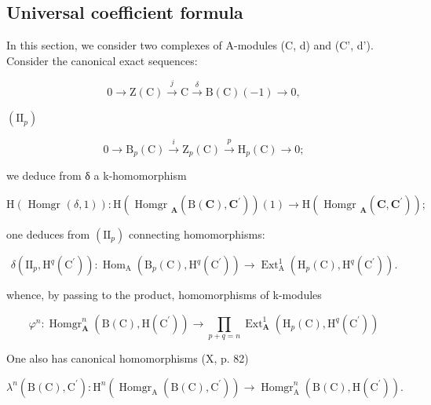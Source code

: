 \subsection{Universal coefficient formula}

In this section, we consider two complexes of A-modules (C, d) and (C', d'). Consider the canonical exact sequences:

\[
0 \rightarrow \mathrm{Z} (\mathrm{C}) \stackrel {{j}} {{\rightarrow}} \mathrm{C} \stackrel {{\delta}} {{\rightarrow}} \mathrm{B} (\mathrm{C}) (- 1) \rightarrow 0,\tag{I}
\]

\((\mathrm{II}_{p})\)

\[
0 \to \mathrm{B} _ {p} (\mathrm{C}) \stackrel {{i}} {{\to}} \mathrm{Z} _ {p} (\mathrm{C}) \stackrel {{p}} {{\to}} \mathrm{H} _ {p} (\mathrm{C}) \to 0;
\]

we deduce from δ a k-homomorphism

\[
\mathrm{H} (\text { Homgr } (\delta , 1)): \mathrm{H} (\text { Homgr } _ {\mathbf {A}} (\mathrm{B} (\mathbf {C}), \mathbf {C} ^ {\prime})) (1) \rightarrow \mathrm{H} (\text { Homgr } _ {\mathbf {A}} (\mathbf {C}, \mathbf {C} ^ {\prime}));
\]

one deduces from \((\mathrm{II}_{p})\) connecting homomorphisms:

\[
\delta \left(\mathrm{II} _ {p}, \mathrm{H} ^ {q} \left(\mathrm{C} ^ {\prime}\right)\right): \operatorname{Hom} _ {\mathrm{A}} \left(\mathrm{B} _ {p} (\mathrm{C}), \mathrm{H} ^ {q} \left(\mathrm{C} ^ {\prime}\right)\right)\rightarrow \operatorname{Ext} _ {\mathrm{A}} ^ {1} \left(\mathrm{H} _ {p} (\mathrm{C}), \mathrm{H} ^ {q} \left(\mathrm{C} ^ {\prime}\right)\right).
\]

whence, by passing to the product, homomorphisms of k-modules

\[
\varphi^ {n}: \operatorname{Homgr} _ {\mathbf {A}} ^ {n} (\mathrm{B} (\mathrm{C}), \mathrm{H} (\mathrm{C} ^ {\prime})) \rightarrow \prod_ {p + q = n} \operatorname{Ext} _ {\mathbf {A}} ^ {1} \left(\mathrm{H} _ {p} (\mathrm{C}), \mathrm{H} ^ {q} (\mathrm{C} ^ {\prime})\right)
\]

One also has canonical homomorphisms (X, p. 82)

\[
\lambda^ {n} (\mathrm{B} (\mathrm{C}), \mathrm{C} ^ {\prime}): \mathrm{H} ^ {n} \left(\operatorname{Homgr} _ {\mathrm{A}} (\mathrm{B} (\mathrm{C}), \mathrm{C} ^ {\prime})\right)\rightarrow \operatorname{Homgr} _ {\mathrm{A}} ^ {n} (\mathrm{B} (\mathrm{C}), \mathrm{H} (\mathrm{C} ^ {\prime})) .
\]

